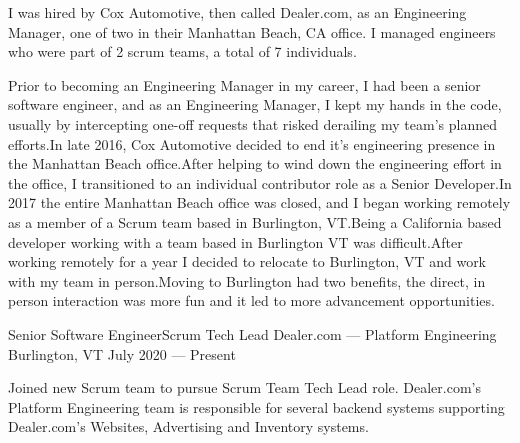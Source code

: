 

\begin{cvparagraph}
I was hired by Cox Automotive, then called Dealer.com, as an
Engineering Manager, one of two in their Manhattan Beach, CA office.
I managed engineers who were part of 2 scrum teams, a total of 7
individuals.
\end{cvparagraph}

\vspace{-1.00mm}

\begin{cvparagraph}
Prior to becoming an Engineering Manager in my career, I had been a
senior software engineer, and as an Engineering Manager, I kept my
hands in the code, usually by intercepting one-off requests that
risked derailing my team's planned efforts.\@ In late 2016, Cox
Automotive decided to end it's engineering presence in the Manhattan
Beach office.\@ After helping to wind down the engineering effort in
the office, I transitioned to an individual contributor role as a
Senior Developer.\@ In 2017 the entire Manhattan Beach office was
closed, and I began working remotely as a member of a Scrum team based
in Burlington, VT.\@ Being a California based developer working with a
team based in Burlington VT was difficult.\@ After working remotely for
a year I decided to relocate to Burlington, VT and work with my team
in person.\@ Moving to Burlington had two benefits, the direct, in
person interaction was more fun and it led to more advancement
opportunities.
\end{cvparagraph}


\begin{cventries}
  \cventry
    {Senior Software Engineer{\enskip\cdotp\enskip}Scrum Tech Lead} %
    {Dealer.com --- Platform Engineering} %
    {Burlington, VT} %
    {July 2020 --- Present} %
    {}
\end{cventries}

\vspace{-4.00mm}
\begin{cvparagraph}
Joined new Scrum team to pursue Scrum Team Tech Lead role. Dealer.com's Platform Engineering team is responsible for several backend systems supporting Dealer.com's Websites, Advertising and Inventory systems.
\end{cvparagraph}

